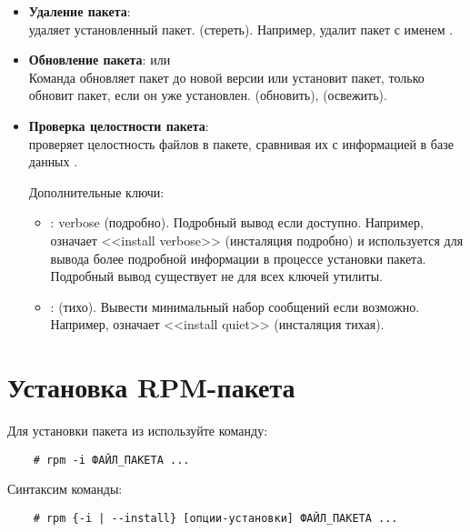 \begin{itemize}
	\item \textbf{Удаление пакета}: \\
	 удаляет установленный пакет. 
	(стереть). Например,  удалит пакет с именем .

	\item \textbf{Обновление пакета}:  или \\
	Команда  обновляет пакет до новой версии или установит пакет, 
	только обновит пакет, если он уже установлен. (обновить), (освежить).

	\item \textbf{Проверка целостности пакета}: \\
	 проверяет целостность файлов в пакете, сравнивая их с информацией в базе данных .

	Дополнительные ключи:
	\begin{itemize}
		\item \textbf{}: verbose (подробно). Подробный вывод если доступно. Например,  означает <<install verbose>>
	 (инсталяция подробно) и используется для вывода более подробной информации в процессе установки пакета. Подробный вывод существует не для всех ключей утилиты.
		\item \textbf{}: (тихо). Вывести минимальный набор сообщений если возможно. Например,  означает <<install quiet>> (инсталяция тихая).
	\end{itemize}


\end{itemize}

\section{Установка RPM-пакета}

Для установки пакета из  используйте команду:
\begin{verbatim}
    # rpm -i ФАЙЛ_ПАКЕТА ...
\end{verbatim}

Синтаксим команды:
\begin{verbatim}
    # rpm {-i | --install} [опции-установки] ФАЙЛ_ПАКЕТА ...
\end{verbatim}

